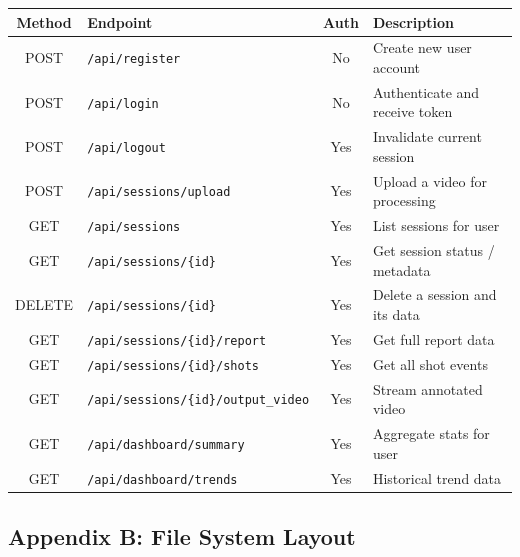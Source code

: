 ﻿\documentclass[11pt,a4paper]{article}
\begin{document}
\begin{longtable}{|c|L{6cm}|c|L{5cm}|}
\hline
\textbf{Method} & \textbf{Endpoint} & \textbf{Auth} & \textbf{Description} \\ \hline
POST & \texttt{/api/register} & No & Create new user account \\ \hline
POST & \texttt{/api/login} & No & Authenticate and receive token \\ \hline
POST & \texttt{/api/logout} & Yes & Invalidate current session \\ \hline
POST & \texttt{/api/sessions/upload} & Yes & Upload a video for processing \\ \hline
GET & \texttt{/api/sessions} & Yes & List sessions for user \\ \hline
GET & \texttt{/api/sessions/\{id\}} & Yes & Get session status / metadata \\ \hline
DELETE & \texttt{/api/sessions/\{id\}} & Yes & Delete a session and its data \\ \hline
GET & \texttt{/api/sessions/\{id\}/report} & Yes & Get full report data \\ \hline
GET & \texttt{/api/sessions/\{id\}/shots} & Yes & Get all shot events \\ \hline
GET & \texttt{/api/sessions/\{id\}/output\_video} & Yes & Stream annotated video \\ \hline
GET & \texttt{/api/dashboard/summary} & Yes & Aggregate stats for user \\ \hline
GET & \texttt{/api/dashboard/trends} & Yes & Historical trend data \\ \hline
\end{longtable}

\subsection*{Appendix B: File System Layout}
\end{document}
